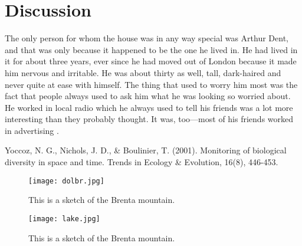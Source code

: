 \documentclass[a4paper, 12pt]{article}
\begin{document}
\section{Discussion}
The only person for whom the house was in any way special was Arthur Dent, and that was only because it happened to be the one he lived in. He had lived in it for about three years, ever since he had moved out of London because it made him nervous and irritable. He was about thirty as well, tall, dark-haired and never quite at ease with himself. The thing that used to worry him most was the fact that people always used to ask him what he was looking so worried about. He worked in local radio which he always used to tell his friends was a lot more interesting than they probably thought. It was, too—most of his friends worked in advertising \citep{yoccoz2001}.

\begin{thebibliography}{999}
    Yoccoz, N. G., Nichols, J. D., \& Boulinier, T. (2001). Monitoring of biological diversity in space and time. Trends in Ecology \& Evolution, 16(8), 446-453.
\end{thebibliography}

\begin{figure}
    \centering
    \texttt{[image: dolbr.jpg]}
    \caption{This is a sketch of the Brenta mountain.}
    \label{fig:brenta}
\end{figure}

\begin{figure}
    \centering
    \texttt{[image: lake.jpg]}
    \caption{This is a sketch of the Brenta mountain.}
    \label{fig:lake}
\end{figure}
\end{document}
